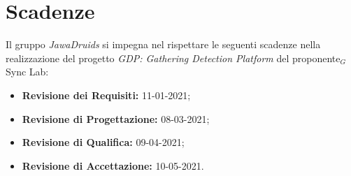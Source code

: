 \section{Scadenze} \label{IntroduzioneScadenze}
Il gruppo \textit{JawaDruids} si impegna nel rispettare le seguenti scadenze nella realizzazione del progetto \textit{GDP: Gathering Detection Platform} del proponente$_G$ Sync Lab:
\begin{itemize}
	\item \textbf{Revisione dei Requisiti:} 11-01-2021;
	\item \textbf{Revisione di Progettazione:} 08-03-2021;
	\item \textbf{Revisione di Qualifica:} 09-04-2021;
	\item \textbf{Revisione di Accettazione:} 10-05-2021.
\end{itemize}